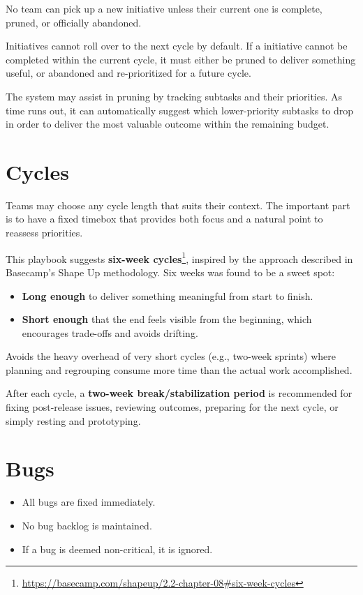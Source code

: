 \documentclass[a4paper]{article}
\begin{document}
No team can pick up a new initiative unless their current one is complete, pruned, or officially abandoned.

Initiatives cannot roll over to the next cycle by default. If a initiative cannot be completed within the current cycle, it must either be pruned to deliver something useful, or abandoned and re-prioritized for a future cycle.

The system may assist in pruning by tracking subtasks and their priorities. As time runs out, it can automatically suggest which lower-priority subtasks to drop in order to deliver the most valuable outcome within the remaining budget.

\section{Cycles}

Teams may choose any cycle length that suits their context. The important part is to have a fixed timebox that provides both focus and a natural point to reassess priorities.

This playbook suggests \textbf{six-week cycles}\footnote{\url{https://basecamp.com/shapeup/2.2-chapter-08#six-week-cycles}}, inspired by the approach described in Basecamp's Shape Up methodology. Six weeks was found to be a sweet spot:


\begin{itemize}
    \item \textbf{Long enough} to deliver something meaningful from start to finish.
    \item \textbf{Short enough} that the end feels visible from the beginning, which encourages trade-offs and avoids drifting.
\end{itemize}

Avoids the heavy overhead of very short cycles (e.g., two-week sprints) where planning and regrouping consume more time than the actual work accomplished.

After each cycle, a \textbf{two-week break/stabilization period} is recommended for fixing post-release issues, reviewing outcomes, preparing for the next cycle, or simply resting and prototyping.

\section{Bugs}

\begin{itemize}
    \item All bugs are fixed immediately.
    \item No bug backlog is maintained.
    \item If a bug is deemed non-critical, it is ignored.
\end{itemize}
\end{document}
